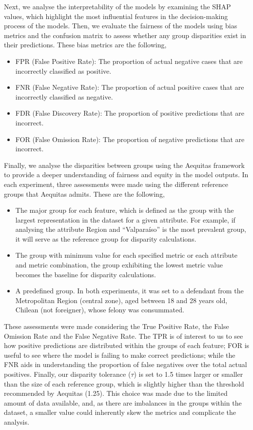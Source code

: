 \documentclass[fleqn,10pt]{wlscirep}
\begin{document}
Next, we analyse the interpretability of the models by examining the SHAP values, which highlight the most influential features in the decision-making process of the models. Then, we evaluate the fairness of the models using bias metrics and the confusion matrix to assess whether any group disparities exist in their predictions. These bias metrics are the following,
\begin{itemize}
    \item FPR (False Positive Rate): The proportion of actual negative cases that are incorrectly classified as positive.
    \item FNR (False Negative Rate): The proportion of actual positive cases that are incorrectly classified as negative.
    \item FDR (False Discovery Rate): The proportion of positive predictions that are incorrect.
    \item FOR (False Omission Rate): The proportion of negative predictions that are incorrect. 
    
\end{itemize}

Finally, we analyse the disparities between groups using the Aequitas framework to provide a deeper understanding of fairness and equity in the model outputs.  In each experiment, three assessments were made using the different reference groups that Aequitas admits. These are the following, 

\begin{itemize}
    \item The major group for each feature, which is defined as the group with the largest representation in the dataset for a given attribute. For example, if analysing the attribute Region and ``Valparaíso'' is the most prevalent group, it will serve as the reference group for disparity calculations.  
    \item The group with minimum value for each specified metric or each attribute and metric combination, the group exhibiting the lowest metric value becomes the baseline for disparity calculations. 
    \item A predefined group. In both experiments, it was set to a defendant from the Metropolitan Region (central zone), aged between 18 and 28 years old, Chilean (not foreigner), whose felony was consummated. 
\end{itemize}


These assessments were made considering the True Positive Rate, the False Omission Rate and the False Negative Rate. The TPR is of interest to us to see how positive predictions are distributed within the groups of each feature; FOR is useful to see where the model is failing to make correct predictions; while the FNR aids in understanding the proportion of false negatives over the total actual positives. Finally, our disparity tolerance ($\tau$) is set to 1.5 times larger or smaller than the size of each reference group, which is slightly higher than the threshold recommended by Aequitas (1.25). This choice was made due to the limited amount of data available, and, as there are imbalances in the groups within the dataset, a smaller value could inherently skew the metrics and complicate the analysis.
\end{document}
